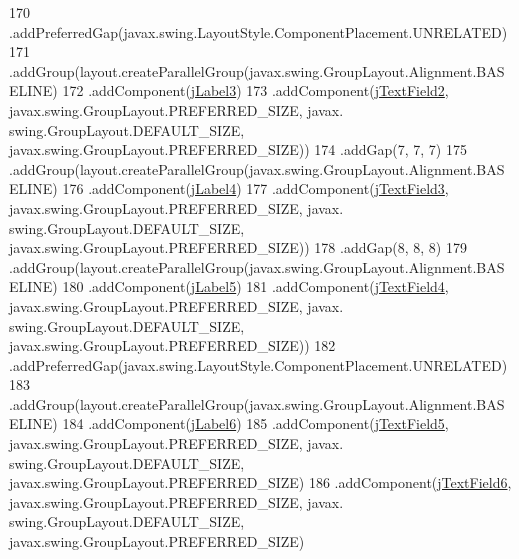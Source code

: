\begin{DoxyCode}
170                 .addPreferredGap(javax.swing.LayoutStyle.ComponentPlacement.UNRELATED)
171                 .addGroup(layout.createParallelGroup(javax.swing.GroupLayout.Alignment.BASELINE)
172                     .addComponent(\mbox{\hyperlink{class_interfaz_package_1_1_alta_libro_texto_a28fbe18428baff77e3ba378260ed8de2}{jLabel3}})
173                     .addComponent(\mbox{\hyperlink{class_interfaz_package_1_1_alta_libro_texto_ae43d7202d0822d35d7b160c6596351e6}{jTextField2}}, javax.swing.GroupLayout.PREFERRED\_SIZE, javax.
      swing.GroupLayout.DEFAULT\_SIZE, javax.swing.GroupLayout.PREFERRED\_SIZE))
174                 .addGap(7, 7, 7)
175                 .addGroup(layout.createParallelGroup(javax.swing.GroupLayout.Alignment.BASELINE)
176                     .addComponent(\mbox{\hyperlink{class_interfaz_package_1_1_alta_libro_texto_a600b84f835ee7c6e403742afe1817957}{jLabel4}})
177                     .addComponent(\mbox{\hyperlink{class_interfaz_package_1_1_alta_libro_texto_ac608b783532f41462f25b74539afaece}{jTextField3}}, javax.swing.GroupLayout.PREFERRED\_SIZE, javax.
      swing.GroupLayout.DEFAULT\_SIZE, javax.swing.GroupLayout.PREFERRED\_SIZE))
178                 .addGap(8, 8, 8)
179                 .addGroup(layout.createParallelGroup(javax.swing.GroupLayout.Alignment.BASELINE)
180                     .addComponent(\mbox{\hyperlink{class_interfaz_package_1_1_alta_libro_texto_a2601c4eaa8dbee3dc1de4d81e78f356c}{jLabel5}})
181                     .addComponent(\mbox{\hyperlink{class_interfaz_package_1_1_alta_libro_texto_ac1148593c3d9a5aab2b7133128c72cc3}{jTextField4}}, javax.swing.GroupLayout.PREFERRED\_SIZE, javax.
      swing.GroupLayout.DEFAULT\_SIZE, javax.swing.GroupLayout.PREFERRED\_SIZE))
182                 .addPreferredGap(javax.swing.LayoutStyle.ComponentPlacement.UNRELATED)
183                 .addGroup(layout.createParallelGroup(javax.swing.GroupLayout.Alignment.BASELINE)
184                     .addComponent(\mbox{\hyperlink{class_interfaz_package_1_1_alta_libro_texto_afe4738d8f372b4cbc512e677ee55c159}{jLabel6}})
185                     .addComponent(\mbox{\hyperlink{class_interfaz_package_1_1_alta_libro_texto_ae2fee696ae7cc02fa1e6d395e6f55052}{jTextField5}}, javax.swing.GroupLayout.PREFERRED\_SIZE, javax.
      swing.GroupLayout.DEFAULT\_SIZE, javax.swing.GroupLayout.PREFERRED\_SIZE)
186                     .addComponent(\mbox{\hyperlink{class_interfaz_package_1_1_alta_libro_texto_a4f5e17cbbb06d3f1876983c80d2587a9}{jTextField6}}, javax.swing.GroupLayout.PREFERRED\_SIZE, javax.
      swing.GroupLayout.DEFAULT\_SIZE, javax.swing.GroupLayout.PREFERRED\_SIZE)

\end{DoxyCode}
